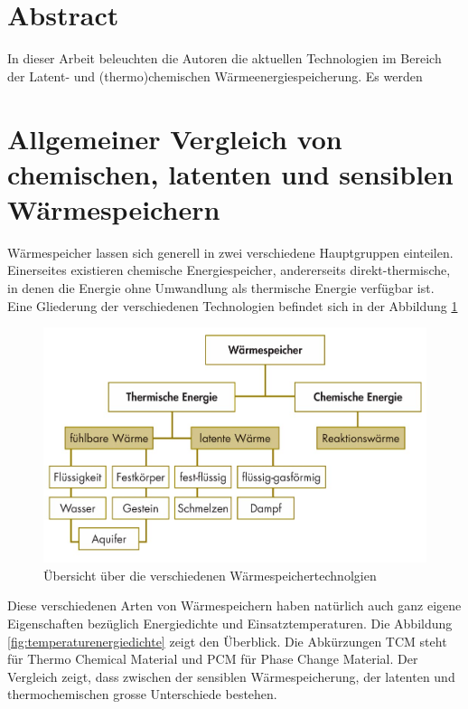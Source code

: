 \documentclass[11pt,a4paper]{scrartcl}
\begin{document}

\tableofcontents
\newpage
\renewcommand{\headrulewidth}{0.4pt}
\renewcommand{\footrulewidth}{0.4pt}
\lhead{}
\rhead{}
\cfoot{}
\setcounter{page}{1}
\cfoot{\thepage}
\section{Abstract}
In dieser Arbeit beleuchten die Autoren die aktuellen Technologien im Bereich
der Latent- und (thermo)chemischen Wärmeenergiespeicherung. Es werden
\newpage
\section{Allgemeiner Vergleich von chemischen, latenten und sensiblen
Wärmespeichern}
Wärmespeicher lassen sich generell in zwei verschiedene Hauptgruppen einteilen.
Einerseites existieren chemische Energiespeicher, andererseits
direkt-thermische, in denen die Energie ohne Umwandlung als thermische Energie
verfügbar ist. Eine Gliederung der verschiedenen Technologien befindet sich in
der Abbildung
\ref{fig:Wärmespeicher}

\begin{figure}[h]
\begin{center}
\includegraphics[scale=0.3]{images/speicher.jpg}
\caption{Übersicht über die verschiedenen Wärmespeichertechnolgien \cite{BINE1}}
\label{fig:Wärmespeicher}
\end{center}
\end{figure}


Diese verschiedenen Arten von Wärmespeichern haben natürlich auch ganz eigene
Eigenschaften bezüglich Energiedichte und Einsatztemperaturen. Die Abbildung
\ref{fig:temperaturenergiedichte} zeigt den Überblick. Die Abkürzungen TCM steht
für Thermo Chemical Material und PCM für Phase Change Material. Der
Vergleich zeigt, dass zwischen der sensiblen Wärmespeicherung, der latenten
und thermochemischen grosse Unterschiede bestehen.
\end{document}
